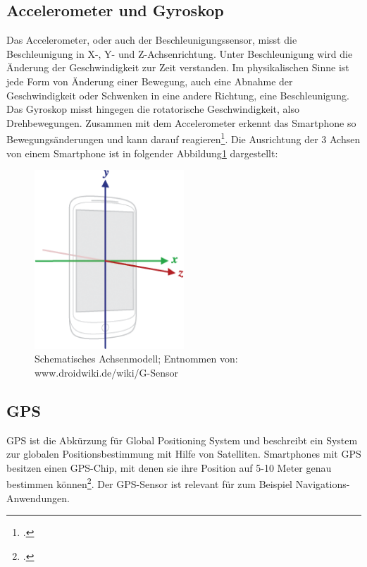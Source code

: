 \subsection{Accelerometer und Gyroskop}

Das Accelerometer, oder auch der Beschleunigungssensor, misst die Beschleunigung in X-, Y- und Z-Achsenrichtung. Unter Beschleunigung wird die Änderung der Geschwindigkeit zur Zeit verstanden. Im physikalischen Sinne ist jede Form von Änderung einer Bewegung, auch eine Abnahme der Geschwindigkeit oder Schwenken in eine andere Richtung, eine Beschleunigung. Das Gyroskop misst hingegen die rotatorische Geschwindigkeit, also Drehbewegungen. Zusammen mit dem Accelerometer erkennt das Smartphone so Bewegungsänderungen und kann darauf reagieren\footcite{AndroidWiki}. Die Ausrichtung der 3 Achsen von einem Smartphone ist in folgender Abbildung\ref{fig:Achsenausrichtung} dargestellt:

\begin{figure}[h]
	\centering
	\includegraphics[width=0.5\textwidth]{Bilder/Axis_device.PNG}
	\caption{Schematisches Achsenmodell; Entnommen von: www.droidwiki.de/wiki/G-Sensor}
	\label{fig:Achsenausrichtung}
\end{figure}

\subsection{GPS}

GPS ist die Abkürzung für Global Positioning System und beschreibt ein System zur globalen Positionsbestimmung mit Hilfe von Satelliten. Smartphones mit GPS besitzen einen GPS-Chip, mit denen sie ihre Position auf 5-10 Meter genau bestimmen können\footcite{AndroidWiki}. Der GPS-Sensor ist relevant für zum Beispiel Navigations-Anwendungen. 

